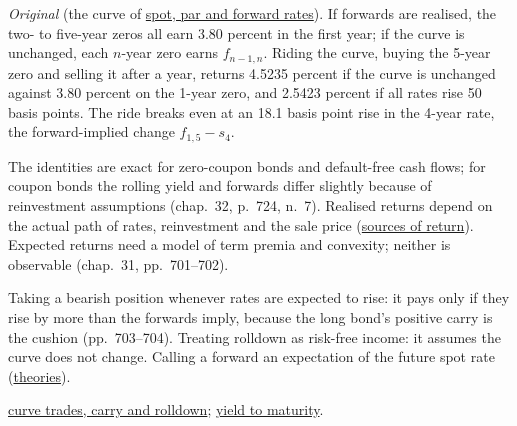 \begin{qfmethod}
\emph{Original} (the curve of \hyperref[meth:spot-par-forward-curves]{spot, par and forward rates}). If forwards are realised, the two- to five-year zeros all earn 3.80 percent in the first year; if the curve is unchanged, each $n$-year zero earns $f_{n-1,n}$. Riding the curve, buying the 5-year zero and selling it after a year, returns 4.5235 percent if the curve is unchanged against 3.80 percent on the 1-year zero, and 2.5423 percent if all rates rise 50 basis points. The ride breaks even at an 18.1 basis point rise in the 4-year rate, the forward-implied change $f_{1,5}-s_4$.

 The identities are exact for zero-coupon bonds and default-free cash flows; for coupon bonds the rolling yield and forwards differ slightly because of reinvestment assumptions (chap.~32, p.~724, n.~7). Realised returns depend on the actual path of rates, reinvestment and the sale price (\hyperref[meth:bond-return-decomposition]{sources of return}). Expected returns need a model of term premia and convexity; neither is observable (chap.~31, pp.~701--702).

 Taking a bearish position whenever rates are expected to rise: it pays only if they rise by more than the forwards imply, because the long bond's positive carry is the cushion (pp.~703--704). Treating rolldown as risk-free income: it assumes the curve does not change. Calling a forward an expectation of the future spot rate (\hyperref[res:term-structure-theories]{theories}).

 \hyperref[meth:curve-trades-carry-rolldown]{curve trades, carry and rolldown}; \hyperref[def:bond-yield-spread-measures]{yield to maturity}.

\end{qfmethod}


